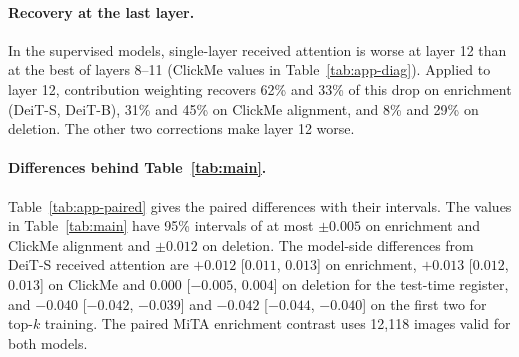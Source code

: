 \paragraph{Recovery at the last layer.} In the supervised models, single-layer received attention is worse at layer 12 than at the best of layers 8--11 (ClickMe values in Table~\ref{tab:app-diag}). Applied to layer 12, contribution weighting recovers 62\% and 33\% of this drop on enrichment (DeiT-S, DeiT-B), 31\% and 45\% on ClickMe alignment, and 8\% and 29\% on deletion. The other two corrections make layer 12 worse.

\begin{table}[!htbp]
\caption{Per-layer diagnostics (Fig.~\ref{fig:diag}a--c) and uncorrected ClickMe alignment (last three columns). S, B, D: DeiT-S, DeiT-B, DINO ViT-S; probe chance: 0.5\%. Values are rounded; DINO layers 9--12 have exactly zero high-norm attention on this dataset.}
\label{tab:app-diag}
\centering

\end{table}

\begin{table}[!tbp]
\caption{Paired differences, layers 9--12: mean, 95\% image-bootstrap interval and verdict (\textit{h}/\textit{c}/\textit{l}: higher/comparable/lower). Margins: 0.02 (enrichment/ClickMe), 0.05 (deletion); intervals unadjusted. Samples: App.~\ref{app:setup}. Top: descriptive correction--R0 contrasts and the primary combination--R0 contrasts. Bottom: primary correction--control contrasts. Registered negative controls are also discussed in App.~\ref{app:setup}.}
\label{tab:app-paired}
\centering

\end{table}



\begin{samepage}\paragraph{Differences behind Table~\ref{tab:main}.} Table~\ref{tab:app-paired} gives the paired differences with their intervals. The values in Table~\ref{tab:main} have 95\% intervals of at most $\pm0.005$ on enrichment and ClickMe alignment and $\pm0.012$ on deletion. The model-side differences from DeiT-S received attention are $+0.012$ [$0.011$, $0.013$] on enrichment, $+0.013$ [$0.012$, $0.013$] on ClickMe and $0.000$ [$-0.005$, $0.004$] on deletion for the test-time register, and $-0.040$ [$-0.042$, $-0.039$] and $-0.042$ [$-0.044$, $-0.040$] on the first two for top-$k$ training. The paired MiTA enrichment contrast uses 12,118 images valid for both models.\par\end{samepage}

